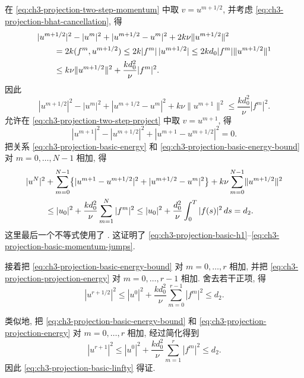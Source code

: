\begin{Proof}
在 \eqref{eq:ch3-projection-two-step-momentum} 中取 $v=u^{m+1/2}$, 并考虑 \eqref{eq:ch3-projection-bhat-cancellation}, 得
\begin{align}
&|u^{m+1/2}|^2-|u^m|^2+|u^{m+1/2}-u^m|^2
+2k\nu\lVert u^{m+1/2}\rVert^2 \notag\\
&\qquad=2k(f^m,u^{m+1/2})
\leq2k|f^m|\,|u^{m+1/2}|
\leq2kd_0|f^m|\lVert u^{m+1/2}\rVert\footnotemark \notag\\
&\qquad\leq k\nu\lVert u^{m+1/2}\rVert^2
+\frac{kd_0^2}{\nu}|f^m|^2.
\label{eq:ch3-projection-basic-energy}
\end{align}
因此
\begin{equation}
|u^{m+1/2}|^2-|u^m|^2+|u^{m+1/2}-u^m|^2
+k\nu\lVert u^{m+1}\rVert^2
\leq\frac{kd_0^2}{\nu}|f^m|^2.
\label{eq:ch3-projection-basic-energy-bound}
\end{equation}
允许在 \eqref{eq:ch3-projection-two-step-project} 中取 $v=u^{m+1}$, 得
\begin{equation}
|u^{m+1}|^2-|u^{m+1/2}|^2
+|u^{m+1}-u^{m+1/2}|^2=0.
\label{eq:ch3-projection-projection-energy}
\end{equation}
把关系 \eqref{eq:ch3-projection-basic-energy} 和 \eqref{eq:ch3-projection-basic-energy-bound} 对 $m=0,\ldots,N-1$ 相加, 得
\begin{align}
|u^N|^2
&+\sum_{m=0}^{N-1}\bigl\{|u^{m+1}-u^{m+1/2}|^2
+|u^{m+1/2}-u^m|^2\bigr\}
+k\nu\sum_{m=0}^{N-1}\lVert u^{m+1/2}\rVert^2 \notag\\
&\leq |u_0|^2+\frac{kd_0^2}{\nu}\sum_{m=1}^N|f^m|^2
\leq |u_0|^2+\frac{d_0^2}{\nu}\int_0^T|f(s)|^2\,ds
=d_2.
\label{eq:ch3-projection-summed-energy}
\end{align}
这里最后一个不等式使用了 . 这证明了 \eqref{eq:ch3-projection-basic-h1}--\eqref{eq:ch3-projection-basic-momentum-jumps}.

接着把 \eqref{eq:ch3-projection-basic-energy-bound} 对 $m=0,\ldots,r$ 相加, 并把 \eqref{eq:ch3-projection-projection-energy} 对 $m=0,\ldots,r-1$ 相加. 舍去若干正项, 得
\[
|u^{r+1/2}|^2\leq|u^0|^2+\frac{kd_0^2}{\nu}\sum_{m=0}^{r-1}|f^m|^2\leq d_2.
\]

\hypertarget{chapter-03-page-286}{}
类似地, 把 \eqref{eq:ch3-projection-basic-energy-bound} 和 \eqref{eq:ch3-projection-projection-energy} 对 $m=0,\ldots,r$ 相加, 经过简化得到
\[
|u^{r+1}|^2\leq|u^0|^2+\frac{kd_0^2}{\nu}\sum_{m=1}^{r}|f^m|^2\leq d_2.
\]
因此 \eqref{eq:ch3-projection-basic-linfty} 得证.
\end{Proof}

